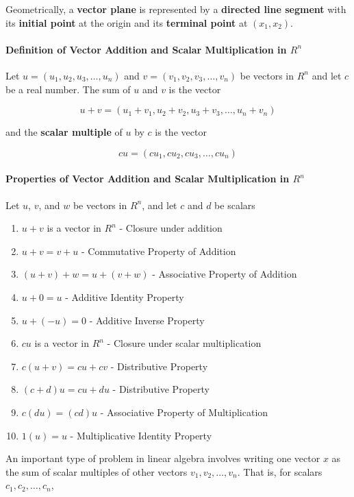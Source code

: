 \documentclass{report}
\begin{document}
Geometrically, a \textbf{vector plane} is represented by a \textbf{directed line segment} with its \textbf{initial point} at the origin and its \textbf{terminal point} at $(x_1,x_2)$.

\paragraph{Definition of Vector Addition and Scalar Multiplication in $R^n$}

Let $u= (u_1,u_2,u_3, \hdots, u_n)$ and $v=(v_1,v_2,v_3,\hdots,v_n)$ be vectors in $R^n$ and let $c$ be a real number. The sum of $u$ and $v$ is the vector

$$
u+v = (u_1 + v_1, u_2 + v_2, u_3 + v_3, \hdots, u_n + v_n)
$$

\noindent and the \textbf{scalar multiple} of $u$ by $c$ is the vector 

$$
cu = (cu_1, cu_2, cu_3, \hdots, cu_n)
$$

\paragraph{Properties of Vector Addition and Scalar Multiplication in $R^n$} 

Let $u$, $v$, and $w$ be vectors in $R^n$, and let $c$ and $d$ be scalars

\begin{enumerate}
    \item $u+v$ is a vector in $R^n$ - Closure under addition
    \item $u+v=v+u$ - Commutative Property of Addition
    \item $(u+v) + w = u + (v+w)$ - Associative Property of Addition
    \item $u+0 = u$ - Additive Identity Property 
    \item $u+(-u)=0$ - Additive Inverse Property
    \item $cu$ is a vector in $R^n$ - Closure under scalar multiplication
    \item $c(u+v) = cu + cv$ - Distributive Property
    \item $(c+d)u = cu + du$ - Distributive Property
    \item $c(du) = (cd)u$ - Associative Property of Multiplication
    \item $1(u) = u$ - Multiplicative Identity Property
\end{enumerate}



An important type of problem in linear algebra involves writing one vector $x$ as the sum of scalar multiples of other vectors $v_1, v_2, \hdots, v_n$. That is, for scalars $c_1,c_2,\hdots,c_n$,
\end{document}
